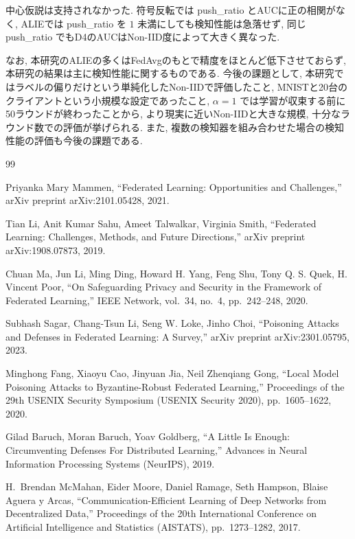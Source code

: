\documentclass[a4j, twocolumn, dvipdfmx]{jsarticle}
\newcommand{\PushRatio}{\textrm{push\_ratio}}
\begin{document}
中心仮説は支持されなかった. 符号反転では \PushRatio{} とAUCに正の相関がなく, ALIEでは \PushRatio{} を $1$ 未満にしても検知性能は急落せず, 同じ \PushRatio{} でもD4のAUCはNon-IID度によって大きく異なった.

なお, 本研究のALIEの多くはFedAvgのもとで精度をほとんど低下させておらず, 本研究の結果は主に検知性能に関するものである. 今後の課題として, 本研究ではラベルの偏りだけという単純化したNon-IIDで評価したこと, MNISTと20台のクライアントという小規模な設定であったこと, $\alpha=1$ では学習が収束する前に50ラウンドが終わったことから, より現実に近いNon-IIDと大きな規模, 十分なラウンド数での評価が挙げられる. また, 複数の検知器を組み合わせた場合の検知性能の評価も今後の課題である.

\clearpage
\begin{thebibliography}{99}

Priyanka Mary Mammen,
``Federated Learning: Opportunities and Challenges,''
arXiv preprint arXiv:2101.05428, 2021.

Tian Li, Anit Kumar Sahu, Ameet Talwalkar, Virginia Smith,
``Federated Learning: Challenges, Methods, and Future Directions,''
arXiv preprint arXiv:1908.07873, 2019.

Chuan Ma, Jun Li, Ming Ding, Howard H. Yang, Feng Shu, Tony Q. S. Quek, H. Vincent Poor,
``On Safeguarding Privacy and Security in the Framework of Federated Learning,''
IEEE Network, vol.~34, no.~4, pp.~242--248, 2020.

Subhash Sagar, Chang-Tsun Li, Seng W. Loke, Jinho Choi,
``Poisoning Attacks and Defenses in Federated Learning: A Survey,''
arXiv preprint arXiv:2301.05795, 2023.

Minghong Fang, Xiaoyu Cao, Jinyuan Jia, Neil Zhenqiang Gong,
``Local Model Poisoning Attacks to Byzantine-Robust Federated Learning,''
Proceedings of the 29th USENIX Security Symposium (USENIX Security 2020),
pp.~1605--1622, 2020.

Gilad Baruch, Moran Baruch, Yoav Goldberg,
``A Little Is Enough: Circumventing Defenses For Distributed Learning,''
Advances in Neural Information Processing Systems (NeurIPS), 2019.

H.~Brendan McMahan, Eider Moore, Daniel Ramage, Seth Hampson, Blaise Aguera y Arcas,
``Communication-Efficient Learning of Deep Networks from Decentralized Data,''
Proceedings of the 20th International Conference on Artificial Intelligence and Statistics (AISTATS),
pp.~1273--1282, 2017.


\end{thebibliography}
\end{document}
